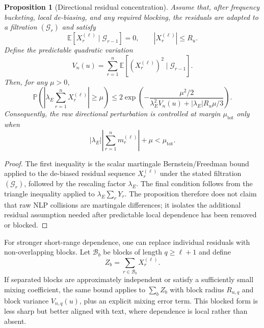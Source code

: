 \documentclass[11pt]{article}
\newtheorem{proposition}[theorem]{Proposition}
\newcommand{\E}{\mathbb{E}}
\newcommand{\Prob}{\mathbb{P}}
\begin{document}
\begin{proposition}[Directional residual concentration]
\label{prop:directional-bernstein}
Assume that, after frequency bucketing, local de-biasing, and any required blocking, the residuals are adapted to a filtration $(\mathcal{G}_r)$ and satisfy
\begin{equation}
\E[X_r^{(\ell)}\mid\mathcal{G}_{r-1}]=0,
\qquad
|X_r^{(\ell)}|\leq R_u .
\end{equation}
Define the predictable quadratic variation
\begin{equation}
V_n(u)=\sum_{r=1}^{n}\E\!\left[(X_r^{(\ell)})^2\mid\mathcal{G}_{r-1}\right].
\end{equation}
Then, for any $\mu>0$,
\begin{equation}
\Prob\!\left(\left|\lambda_E\sum_{r=1}^{n}X_r^{(\ell)}\right|\geq \mu\right)
\leq
2\exp\!\left(
-\frac{\mu^2/2}{\lambda_E^2 V_n(u)+|\lambda_E|R_u\mu/3}
\right).
\end{equation}
Consequently, the raw directional perturbation is controlled at margin $\mu_{\mathrm{tot}}$ only when
\begin{equation}
|\lambda_E|\left|\sum_{r=1}^{n}m_r^{(\ell)}\right| + \mu < \mu_{\mathrm{tot}}.
\end{equation}
\end{proposition}

\begin{proof}
The first inequality is the scalar martingale Bernstein/Freedman bound applied to the de-biased residual sequence $X_r^{(\ell)}$ under the stated filtration $(\mathcal{G}_r)$, followed by the rescaling factor $\lambda_E$. The final condition follows from the triangle inequality applied to $\lambda_E\sum_r Y_r$. The proposition therefore does not claim that raw NLP collisions are martingale differences; it isolates the additional residual assumption needed after predictable local dependence has been removed or blocked.
\end{proof}

For stronger short-range dependence, one can replace individual residuals with non-overlapping blocks. Let $\mathcal{B}_b$ be blocks of length $q\geq \ell+1$ and define
\begin{equation}
Z_b = \sum_{r\in\mathcal{B}_b} X_r^{(\ell)} .
\end{equation}
If separated blocks are approximately independent or satisfy a sufficiently small mixing coefficient, the same bound applies to $\sum_b Z_b$ with block radius $R_{u,q}$ and block variance $V_{n,q}(u)$, plus an explicit mixing error term. This blocked form is less sharp but better aligned with text, where dependence is local rather than absent.
\end{document}
